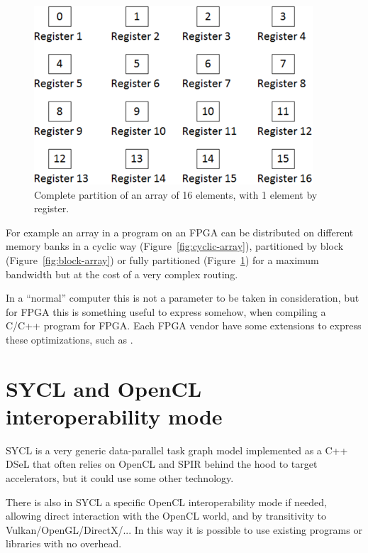 \documentclass[sigplan, review, authordraft]{acmart}
\begin{document}
\begin{figure}
  \includegraphics[width=\hsize]{Figures/complete_partition_array}
  \caption{Complete partition of an array of 16 elements, with 1 element
    by register.}
\label{fig:complete-partition-array}
\end{figure}

For example an array in a program on an FPGA can be distributed on
different memory banks in a cyclic way (Figure~\ref{fig:cyclic-array}),
partitioned by block (Figure~\ref{fig:block-array}) or fully partitioned
(Figure~\ref{fig:complete-partition-array}) for a maximum bandwidth but at
the cost of a very complex routing.

In a ``normal'' computer this is not a parameter to be taken in
consideration, but for FPGA this is something useful to express somehow,
when compiling a C/C++ program for FPGA. Each FPGA vendor have some
extensions to express these optimizations, such as
\cite{iwocl16,sdsoc,hls,sdaccel,altera}.


\section{SYCL and OpenCL interoperability mode}
\label{sec:sycl-opencl-inter}

SYCL is a very generic data-parallel task graph model implemented as a
C++ DSeL that often relies on OpenCL and SPIR behind the hood to
target accelerators, but it could use some other technology.

There is also in SYCL a specific OpenCL interoperability mode if
needed, allowing direct interaction with the OpenCL world, and by
transitivity to Vulkan/OpenGL/DirectX/... In this way it is possible
to use existing programs or libraries with no overhead.
\end{document}
